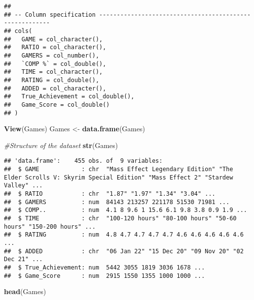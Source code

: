 \documentclass[
]{article}
\newenvironment{Shaded}{\begin{snugshade}}{\end{snugshade}}
\newcommand{\CommentTok}[1]{\textcolor[rgb]{0.56,0.35,0.01}{\textit{#1}}}
\newcommand{\KeywordTok}[1]{\textcolor[rgb]{0.13,0.29,0.53}{\textbf{#1}}}
\newcommand{\NormalTok}[1]{#1}
\newcommand{\StringTok}[1]{\textcolor[rgb]{0.31,0.60,0.02}{#1}}
\begin{document}
\begin{verbatim}
## 
## -- Column specification --------------------------------------------------------
## cols(
##   GAME = col_character(),
##   RATIO = col_character(),
##   GAMERS = col_number(),
##   `COMP %` = col_double(),
##   TIME = col_character(),
##   RATING = col_double(),
##   ADDED = col_character(),
##   True_Achievement = col_double(),
##   Game_Score = col_double()
## )
\end{verbatim}

\begin{Shaded}
\begin{Highlighting}[]
\KeywordTok{View}\NormalTok{(Games)}
\NormalTok{Games <-}\StringTok{ }\KeywordTok{data.frame}\NormalTok{(Games)}
\end{Highlighting}
\end{Shaded}

\begin{Shaded}
\begin{Highlighting}[]
\CommentTok{#Structure of the dataset}
\KeywordTok{str}\NormalTok{(Games)}
\end{Highlighting}
\end{Shaded}

\begin{verbatim}
## 'data.frame':    455 obs. of  9 variables:
##  $ GAME            : chr  "Mass Effect Legendary Edition" "The Elder Scrolls V: Skyrim Special Edition" "Mass Effect 2" "Stardew Valley" ...
##  $ RATIO           : chr  "1.87" "1.97" "1.34" "3.04" ...
##  $ GAMERS          : num  84143 213257 221178 51530 71981 ...
##  $ COMP..          : num  4.1 8 9.6 1 15.6 6.1 9.8 3.8 0.9 1.9 ...
##  $ TIME            : chr  "100-120 hours" "80-100 hours" "50-60 hours" "150-200 hours" ...
##  $ RATING          : num  4.8 4.7 4.7 4.7 4.7 4.6 4.6 4.6 4.6 4.6 ...
##  $ ADDED           : chr  "06 Jan 22" "15 Dec 20" "09 Nov 20" "02 Dec 21" ...
##  $ True_Achievement: num  5442 3055 1819 3036 1678 ...
##  $ Game_Score      : num  2915 1550 1355 1000 1000 ...
\end{verbatim}

\begin{Shaded}
\begin{Highlighting}[]
\KeywordTok{head}\NormalTok{(Games)}
\end{Highlighting}
\end{Shaded}
\end{document}

